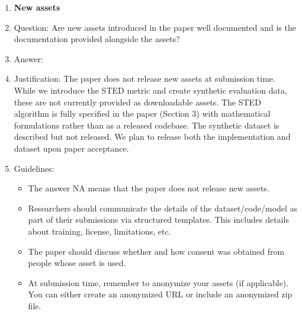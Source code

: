 \documentclass{article}
\begin{document}
\begin{enumerate}
\item {\bf New assets}
    \item[] Question: Are new assets introduced in the paper well documented and is the documentation provided alongside the assets?
    \item[] Answer: \answerNA{} %
    \item[] Justification: \justification The paper does not release new assets at submission time. While we introduce the STED metric and create synthetic evaluation data, these are not currently provided as downloadable assets. The STED algorithm is fully specified in the paper (Section 3) with mathematical formulations rather than as a released codebase. The synthetic dataset is described but not released. We plan to release both the implementation and dataset upon paper acceptance.{}
    \item[] Guidelines:
    \begin{itemize}
        \item The answer NA means that the paper does not release new assets.
        \item Researchers should communicate the details of the dataset/code/model as part of their submissions via structured templates. This includes details about training, license, limitations, etc. 
        \item The paper should discuss whether and how consent was obtained from people whose asset is used.
        \item At submission time, remember to anonymize your assets (if applicable). You can either create an anonymized URL or include an anonymized zip file.
    \end{itemize}


\end{enumerate}
\end{document}
